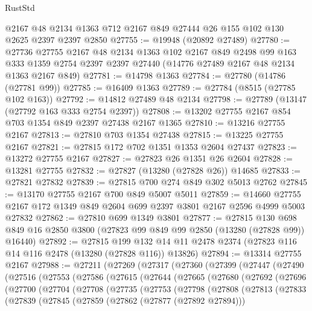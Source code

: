 \begin{lexlean}{RustStd}
\begin{coremodule}
    @2167
    @48
    @2134
    @1363
    @712
    @2167
    @849
    @27444
    @26
    @155
    @102
    @130
    @2625
    @2397
    @2397
    @2850
@27755 := @19948 (@20892 @27489)
@27780 := @27736
    @27755
    @2167
    @48
    @2134
    @1363
    @102
    @2167
    @849
    @2498
    @99
    @163
    @333
    @1359
    @2754
    @2397
    @2397
    @27440
    (@14776 @27489 @2167 @48 @2134 @1363 @2167 @849)
@27781 := @14798 @1363
@27784 := @27780 (@14786 (@27781 @99))
@27785 := @16409 @1363
@27789 := @27784 (@8515 (@27785 @102 @163))
@27792 := @14812 @27489 @48 @2134
@27798 := @27789 (@13147 (@27792 @163 @333 @2754 @2397))
@27808 := @13202 @27755 @2167 @854 @703 @1354 @849 @2397 @27438 @2167 @1365
@27810 := @13216 @27755 @2167
@27813 := @27810 @703 @1354 @27438
@27815 := @13225 @27755 @2167
@27821 := @27815 @172 @702 @1351 @1353 @2604 @27437
@27823 := @13272 @27755 @2167
@27827 := @27823 @26 @1351 @26 @2604
@27828 := @13281 @27755
@27832 := @27827 (@13280 (@27828 @26)) @14685
@27833 := @27821 @27832
@27839 := @27815 @700 @274 @849 @302 @5013 @2762
@27845 := @13170 @27755 @2167 @700 @849 @5007 @5011
@27859 := @14660 @27755 @2167 @172 @1349 @849 @2604 @699 @2397 @3801 @2167 @2596 @4999 @5003 @27832
@27862 := @27810 @699 @1349 @3801
@27877 := @27815
    @130
    @698
    @849
    @16
    @2850
    @3800
    (@27823 @99 @849 @99 @2850 (@13280 (@27828 @99)) @16440)
@27892 := @27815
    @199
    @132
    @14
    @11
    @2478
    @2374
    (@27823 @116 @14 @116 @2478 (@13280 (@27828 @116)) @13826)
@27894 := @13314 @27755 @2167
@27988 := @27211
    (@27269
      (@27317
        (@27360
          (@27399
            (@27447
              (@27490
                (@27516
                  (@27553
                    (@27586
                      (@27615
                        (@27644
                          (@27665
                            (@27680
                              (@27692
                                (@27696
                                  (@27700
                                    (@27704
                                      (@27708
                                        (@27735
                                          (@27753
                                            (@27798
                                              (@27808
                                                (@27813
                                                  (@27833
                                                    (@27839
                                                      (@27845
                                                        (@27859
                                                          (@27862 (@27877 (@27892 @27894)))

\end{coremodule}
\end{lexlean}
